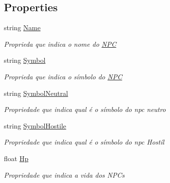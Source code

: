 \subsection*{Properties}
\begin{DoxyCompactItemize}
\item 
string \mbox{\hyperlink{class_projeto2___l_p1_1_1_n_p_c_a8b3dd87bf2cfb6c58eb4182fe586d90a}{Name}}
\begin{DoxyCompactList}\small\item\em Proprieda que indica o nome do \mbox{\hyperlink{class_projeto2___l_p1_1_1_n_p_c}{N\+PC}} \end{DoxyCompactList}\item 
string \mbox{\hyperlink{class_projeto2___l_p1_1_1_n_p_c_a94add914dfb14f028592902c75dc0f43}{Symbol}}
\begin{DoxyCompactList}\small\item\em Proprieda que indica o símbolo do \mbox{\hyperlink{class_projeto2___l_p1_1_1_n_p_c}{N\+PC}} \end{DoxyCompactList}\item 
string \mbox{\hyperlink{class_projeto2___l_p1_1_1_n_p_c_a0e1847744e4e9042beab9c08c7b93b74}{Symbol\+Neutral}}
\begin{DoxyCompactList}\small\item\em Propriedade que indica qual é o símbolo do npc neutro \end{DoxyCompactList}\item 
string \mbox{\hyperlink{class_projeto2___l_p1_1_1_n_p_c_ad5df0c2b90e709c205cdac72a2d535f6}{Symbol\+Hostile}}
\begin{DoxyCompactList}\small\item\em Propriedade que indica qual é o símbolo do npc Hostíl \end{DoxyCompactList}\item 
float \mbox{\hyperlink{class_projeto2___l_p1_1_1_n_p_c_a21542104cceaec6edd15d95c6b472d2d}{Hp}}
\begin{DoxyCompactList}\small\item\em Propriedade que indica a vida dos N\+P\+Cs \end{DoxyCompactList}\item 

\end{DoxyCompactItemize}
